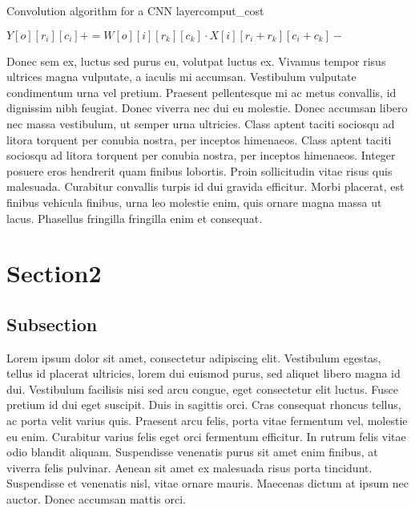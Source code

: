 \documentclass{thesis}
\begin{document}
\begin{thesisalgorithm}[t]{Convolution algorithm for a CNN layer}{comput_cost}

							\State
							$Y[o][r_i][c_i] += W[o][i][r_k][c_k] \cdot X[i][r_i+r_k][c_i+c_k]-$
						\EndFor
					\EndFor
				\EndFor
			\EndFor
		\EndFor
	\EndFor

\end{thesisalgorithm}

Donec sem ex, luctus sed purus eu, volutpat luctus ex. Vivamus tempor risus ultrices magna vulputate, a iaculis mi accumsan. Vestibulum vulputate condimentum urna vel pretium. Praesent pellentesque mi ac metus convallis, id dignissim nibh feugiat. Donec viverra nec dui eu molestie. Donec accumsan libero nec massa vestibulum, ut semper urna ultricies. Class aptent taciti sociosqu ad litora torquent per conubia nostra, per inceptos himenaeos. Class aptent taciti sociosqu ad litora torquent per conubia nostra, per inceptos himenaeos. Integer posuere eros hendrerit quam finibus lobortis. Proin sollicitudin vitae risus quis malesuada. Curabitur convallis turpis id dui gravida efficitur. Morbi placerat, est finibus vehicula finibus, urna leo molestie enim, quis ornare magna massa ut lacus. Phasellus fringilla fringilla enim et consequat.

\section{Section2}
\subsection{Subsection}

Lorem ipsum dolor sit amet, consectetur adipiscing elit. Vestibulum egestas, tellus id placerat ultricies, lorem dui euismod purus, sed aliquet libero magna id dui. Vestibulum facilisis nisi sed arcu congue, eget consectetur elit luctus. Fusce pretium id dui eget suscipit. Duis in sagittis orci. Cras consequat rhoncus tellus, ac porta velit varius quis. Praesent arcu felis, porta vitae fermentum vel, molestie eu enim. Curabitur varius felis eget orci fermentum efficitur. In rutrum felis vitae odio blandit aliquam. Suspendisse venenatis purus sit amet enim finibus, at viverra felis pulvinar. Aenean sit amet ex malesuada risus porta tincidunt. Suspendisse et venenatis nisl, vitae ornare mauris. Maecenas dictum at ipsum nec auctor. Donec accumsan mattis orci. 
\end{document}
